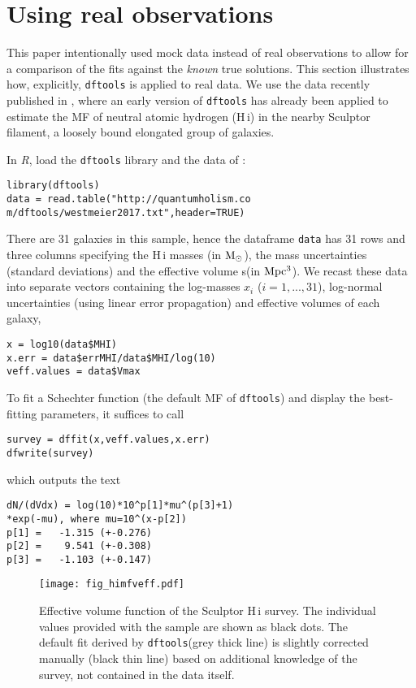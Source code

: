 \documentclass[a4paper,fleqn,usenatbib]{mnras}
\newcommand{\msun}{{\rm M}_{\odot}}
\newcommand{\dftools}{\texttt{dftools}\xspace}
\newcommand{\ha}{H{\sc\,i}\xspace}
\begin{document}
\section{Using real observations}

This paper intentionally used mock data instead of real observations to allow for a comparison of the fits against the \emph{known} true solutions. This section illustrates how, explicitly, \dftools is applied to real data. We use the data recently published in \cite{Westmeier2017}, where an early version of \dftools has already been applied to estimate the MF of neutral atomic hydrogen (\ha) in the nearby Sculptor filament, a loosely bound elongated group of galaxies.

In \textit{R}, load the \dftools library and the data of \cite{Westmeier2017}:
%
{\color{blue}\begin{lstlisting}
library(dftools)
data = read.table("http://quantumholism.co
m/dftools/westmeier2017.txt",header=TRUE)
\end{lstlisting}}
%
\noindent There are 31 galaxies in this sample, hence the dataframe \texttt{data} has 31 rows and three columns specifying the \ha masses (in $\msun$), the mass uncertainties (standard deviations) and the effective volume s(in $\rm Mpc^3$). We recast these data into separate vectors containing the log-masses $x_i$ ($i=1,...,31$), log-normal uncertainties (using linear error propagation) and effective volumes of each galaxy,
%
{\color{blue}\begin{lstlisting}
x = log10(data$MHI)
x.err = data$errMHI/data$MHI/log(10)
veff.values = data$Vmax
\end{lstlisting}}
%
\noindent To fit a Schechter function (the default MF of \dftools) and display the best-fitting parameters, it suffices to call
%
{\color{blue}\begin{lstlisting}
survey = dffit(x,veff.values,x.err)
dfwrite(survey)
\end{lstlisting}}
%
\noindent which outputs the text
%
{\color{blue}\begin{lstlisting}
dN/(dVdx) = log(10)*10^p[1]*mu^(p[3]+1)
*exp(-mu), where mu=10^(x-p[2])
p[1] =   -1.315 (+-0.276)
p[2] =    9.541 (+-0.308)
p[3] =   -1.103 (+-0.147)
\end{lstlisting}}

\begin{figure}
\begin{center}
\texttt{[image: fig\_himfveff.pdf]}\vspace{-4mm}
\caption{Effective volume function of the Sculptor \ha survey. The individual values provided with the sample are shown as black dots. The default fit derived by \dftools (grey thick line) is slightly corrected manually (black thin line) based on additional knowledge of the survey, not contained in the data itself.}\label{fig:himfveff}
\end{center}
\end{figure}
\end{document}
